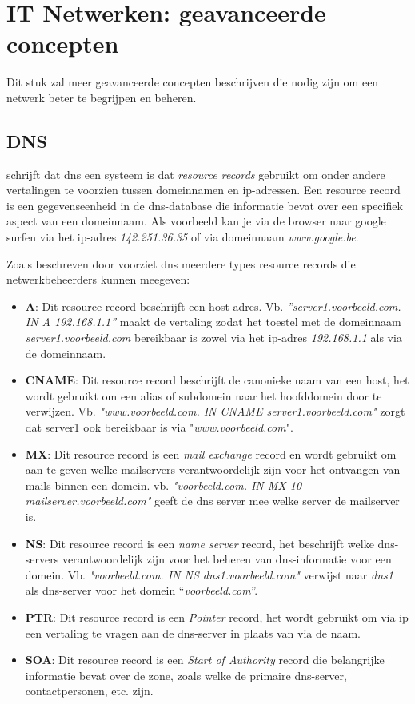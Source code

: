 {\section{IT Netwerken: geavanceerde concepten}
Dit stuk zal meer geavanceerde concepten beschrijven die nodig zijn om een netwerk beter te begrijpen en beheren.

\subsection{DNS}
\textcite{Mockapetris1987} schrijft dat \acrshort{dns} een systeem is dat \textit{resource records} gebruikt om onder andere vertalingen te voorzien tussen domeinnamen en \acrshort{ip}-adressen. Een resource record is een gegevenseenheid in de \acrshort{dns}-database die informatie bevat over een specifiek aspect van een domeinnaam. Als voorbeeld kan je via de browser naar google surfen via het \acrshort{ip}-adres \textit{142.251.36.35} of via domeinnaam \textit{www.google.be}. 

Zoals beschreven door \textcite{Mockapetris1987} voorziet \acrshort{dns} meerdere types resource records die netwerkbeheerders kunnen meegeven: 
\begin{itemize}
    \item \textbf{A}: Dit resource record beschrijft een host adres. 
    Vb. \textit{”server1.voorbeeld.com. IN A 192.168.1.1”} maakt de vertaling zodat het toestel met de domeinnaam \textit{server1.voorbeeld.com} bereikbaar is zowel via het \acrshort{ip}-adres \textit{192.168.1.1} als via de domeinnaam. 
    \item \textbf{CNAME}: Dit resource record beschrijft de canonieke naam van een host, het wordt gebruikt om een alias of subdomein naar het hoofddomein door te verwijzen. Vb. \textit{"www.voorbeeld.com. IN CNAME server1.voorbeeld.com"} zorgt dat server1 ook bereikbaar is via "\textit{www.voorbeeld.com}".
    \item \textbf{MX}: Dit resource record is een \textit{mail exchange} record en wordt gebruikt om aan te geven welke mailservers verantwoordelijk zijn voor het ontvangen van mails binnen een domein. vb. \textit{"voorbeeld.com. IN MX 10 mailserver.voorbeeld.com"} geeft de \acrshort{dns} server mee welke server de mailserver is.
    \item \textbf{NS}: Dit resource record is een \textit{name server} record, het beschrijft welke \acrshort{dns}-servers verantwoordelijk zijn voor het beheren van \acrshort{dns}-informatie voor een domein. Vb. \textit{"voorbeeld.com. IN NS dns1.voorbeeld.com"} verwijst naar \textit{dns1} als \acrshort{dns}-server voor het domein “\textit{voorbeeld.com}”.
    \item \textbf{PTR}: Dit resource record is een \textit{Pointer} record, het wordt gebruikt om via \acrshort{ip} een vertaling te vragen aan de \acrshort{dns}-server in plaats van via de naam.
    \item \textbf{SOA}: Dit resource record is een \textit{Start of Authority} record die belangrijke informatie bevat over de zone, zoals welke de primaire \acrshort{dns}-server, contactpersonen, etc. zijn.
\end{itemize}

}
